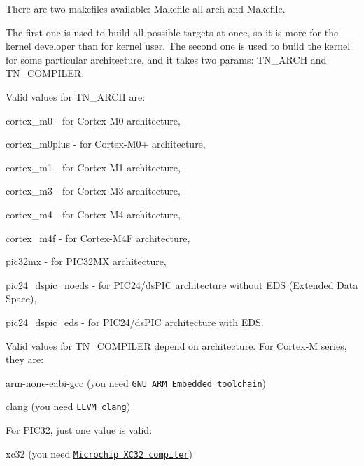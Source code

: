 There are two makefiles available\+: {\ttfamily Makefile-\/all-\/arch} and {\ttfamily Makefile}.

The first one is used to build all possible targets at once, so it is more for the kernel developer than for kernel user. The second one is used to build the kernel for some particular architecture, and it takes two params\+: {\ttfamily T\+N\+\_\+\+A\+R\+CH} and {\ttfamily T\+N\+\_\+\+C\+O\+M\+P\+I\+L\+ER}.

Valid values for {\ttfamily T\+N\+\_\+\+A\+R\+CH} are\+:


\begin{DoxyItemize}
\item {\ttfamily cortex\+\_\+m0} -\/ for Cortex-\/\+M0 architecture,
\item {\ttfamily cortex\+\_\+m0plus} -\/ for Cortex-\/\+M0+ architecture,
\item {\ttfamily cortex\+\_\+m1} -\/ for Cortex-\/\+M1 architecture,
\item {\ttfamily cortex\+\_\+m3} -\/ for Cortex-\/\+M3 architecture,
\item {\ttfamily cortex\+\_\+m4} -\/ for Cortex-\/\+M4 architecture,
\item {\ttfamily cortex\+\_\+m4f} -\/ for Cortex-\/\+M4F architecture,
\item {\ttfamily pic32mx} -\/ for P\+I\+C32\+MX architecture,
\item {\ttfamily pic24\+\_\+dspic\+\_\+noeds} -\/ for P\+I\+C24/ds\+P\+IC architecture without E\+DS (Extended Data Space),
\item {\ttfamily pic24\+\_\+dspic\+\_\+eds} -\/ for P\+I\+C24/ds\+P\+IC architecture with E\+DS.
\end{DoxyItemize}

Valid values for {\ttfamily T\+N\+\_\+\+C\+O\+M\+P\+I\+L\+ER} depend on architecture. For Cortex-\/M series, they are\+:


\begin{DoxyItemize}
\item {\ttfamily arm-\/none-\/eabi-\/gcc} (you need \href{https://launchpad.net/~terry.guo/+archive/ubuntu/gcc-arm-embedded}{\tt G\+NU A\+RM Embedded toolchain})
\item {\ttfamily clang} (you need \href{http://clang.llvm.org/}{\tt L\+L\+VM clang})
\end{DoxyItemize}

For P\+I\+C32, just one value is valid\+:


\begin{DoxyItemize}
\item {\ttfamily xc32} (you need \href{http://www.microchip.com/xc32}{\tt Microchip X\+C32 compiler})
\end{DoxyItemize}

